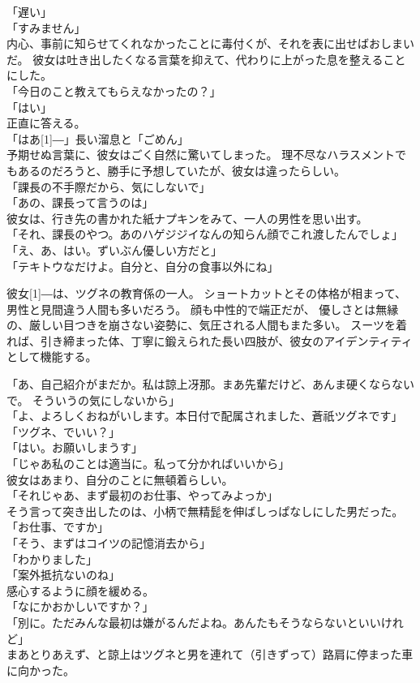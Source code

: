 \documentclass[../NenokuniMain]{subfiles}
\begin{document}
「遅い」\\
「すみません」\\
内心、事前に知らせてくれなかったことに毒付くが、それを表に出せばおしまいだ。
彼女は吐き出したくなる言葉を抑えて、代わりに上がった息を整えることにした。\\
「今日のこと教えてもらえなかったの？」\\
「はい」\\
正直に答える。\\
「はあ\scalebox{2}[1]{―}」長い溜息と「ごめん」\\
予期せぬ言葉に、彼女はごく自然に驚いてしまった。
理不尽なハラスメントでもあるのだろうと、勝手に予想していたが、彼女は違ったらしい。\\
「課長の不手際だから、気にしないで」\\
「あの、課長って言うのは」\\
彼女は、行き先の書かれた紙ナプキンをみて、一人の男性を思い出す。\\
「それ、課長のやつ。あのハゲジジイなんの知らん顔でこれ渡したんでしょ」\\
「え、あ、はい。ずいぶん優しい方だと」\\
「テキトウなだけよ。自分と、自分の食事以外にね」

彼女\scalebox{2}[1]{―}は、ツグネの教育係の一人。
ショートカットとその体格が相まって、男性と見間違う人間も多いだろう。
顔も中性的で端正だが、
優しさとは無縁の、厳しい目つきを崩さない姿勢に、気圧される人間もまた多い。
スーツを着れば、引き締まった体、丁寧に鍛えられた長い四肢が、彼女のアイデンティティとして機能する。

「あ、自己紹介がまだか。私は諒上冴那。まあ先輩だけど、あんま硬くならないで。
そういうの気にしないから」\\
「よ、よろしくおねがいします。本日付で配属されました、蒼祇ツグネです」\\
「ツグネ、でいい？」\\
「はい。お願いしまうす」\\
「じゃあ私のことは適当に。私って分かればいいから」\\
彼女はあまり、自分のことに無頓着らしい。\\
「それじゃあ、まず最初のお仕事、やってみよっか」\\
そう言って突き出したのは、小柄で無精髭を伸ばしっぱなしにした男だった。\\
「お仕事、ですか」\\
「そう、まずはコイツの記憶消去から」\\
「わかりました」\\
「案外抵抗ないのね」\\
感心するように顔を緩める。\\
「なにかおかしいですか？」\\
「別に。ただみんな最初は嫌がるんだよね。あんたもそうならないといいけれど」\\
まあとりあえず、と諒上はツグネと男を連れて（引きずって）路肩に停まった車に向かった。
\end{document}
